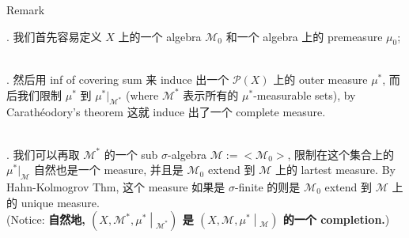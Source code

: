 \begin{qlremark}{Remark}

. 我们首先容易定义 \(X\) 上的一个 algebra \(\mathcal{M}_{0}\) 和一个 algebra 上的 premeasure \(\mu_{0}\);\\
\strut \\
. 然后用 inf of covering sum 来 induce 出一个 \(\mathcal{P}(X)\) 上的 outer measure \(\mu^{\ast}\), 而后我们限制 \(\mu^{\ast}\) 到 \(\mu^{\ast}|_{\mathcal{M}^{\ast}}\) (where \(\mathcal{M}^{\ast}\) 表示所有的 \(\mu^{\ast}\)-measurable sets), by Carathéodory's theorem 这就 induce 出了一个 complete measure.\\
\strut \\
. 我们可以再取 \(\mathcal{M}^{\ast}\) 的一个 sub \(\sigma\)-algebra \(\mathcal{M} := < \mathcal{M}_{0} >\), 限制在这个集合上的 \(\mu^{\ast}|_{\mathcal{M}}\) 自然也是一个 measure, 并且是 \(\mathcal{M}_{0}\) extend 到 \(\mathcal{M}\) 上的 lartest measure. By Hahn-Kolmogrov Thm, 这个 measure 如果是 \(\sigma\)-finite 的则是 \(\mathcal{M}_{0}\) extend 到 \(\mathcal{M}\) 上的 unique measure.\\
(Notice: \textbf{自然地, \(\left. (X,\mathcal{M}^{\ast},\mu^{\ast} \middle| {}_{\mathcal{M}^{\ast}}) \right.\) 是 \(\left. (X,\mathcal{M},\mu^{\ast} \middle| {}_{\mathcal{M}}) \right.\) 的一个 completion.})

\end{qlremark}

